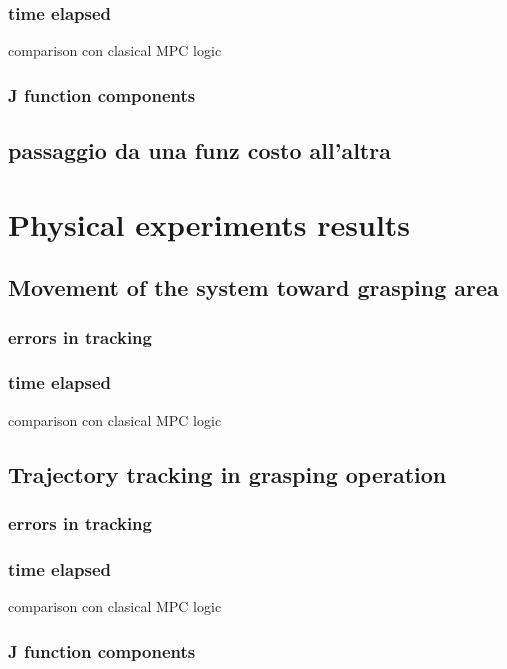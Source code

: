 	\subsubsection{time elapsed}
		comparison con clasical MPC logic
	\subsubsection{J function components}
	
	\subsection{passaggio da una funz costo all'altra}

\section{Physical experiments results}

\subsection{Movement of the system toward grasping area}

	\subsubsection{errors in tracking}
		
	\subsubsection{time elapsed}
		comparison con clasical MPC logic

\subsection{Trajectory tracking in grasping operation}

	\subsubsection{errors in tracking}
		
	\subsubsection{time elapsed}
		comparison con clasical MPC logic
	\subsubsection{J function components}
